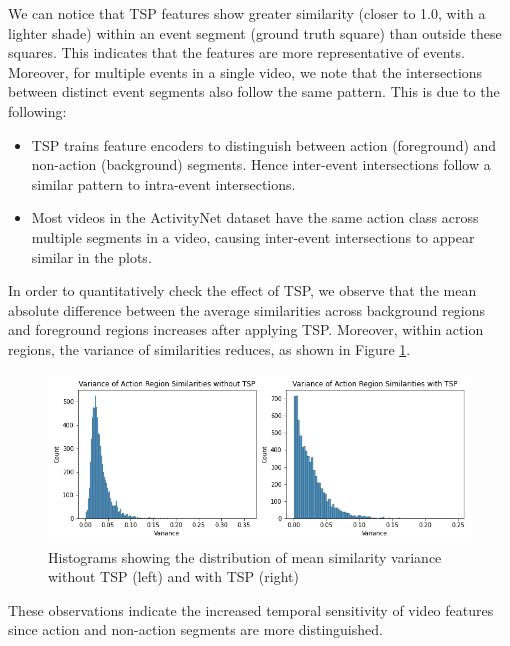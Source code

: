 \par We can notice that TSP features show greater similarity (closer to 1.0, with a lighter shade) within an event segment (ground truth square) than outside these squares. This indicates that the features are more representative of events. Moreover, for multiple events in a single video, we note that the intersections between distinct event segments also follow the same pattern. This is due to the following: 
\begin{itemize}
	\item TSP trains feature encoders to distinguish between action (foreground) and non-action (background) segments. Hence inter-event intersections follow a similar pattern to intra-event intersections.
	\item Most videos in the ActivityNet dataset have the same action class across multiple segments in a video, causing inter-event intersections to appear similar in the plots.
\end{itemize}

\par In order to quantitatively check the effect of TSP, we observe that the mean absolute difference between the average similarities across background regions and foreground regions increases after applying TSP. Moreover, within action regions, the variance of similarities reduces, as shown in Figure \ref{fig:tsp-action-var}.


\begin{figure}
    \includegraphics[width=\linewidth]{assets/img/tsp/tsp-action-sim.png}
    \caption{Histograms showing the distribution of mean similarity variance without TSP (left) and with TSP (right)}

	\label{fig:tsp-action-var}
\end{figure}

\par These observations indicate the increased temporal sensitivity of video features since action and non-action segments are more distinguished.